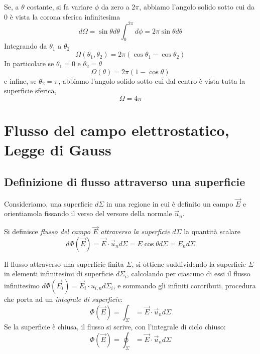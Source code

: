 \documentclass[class=book, crop=false, oneside, 12pt]{standalone}
\begin{document}
Se, a \(\theta\) costante, si fa variare \(\phi\) da zero a \(2 \pi\), abbiamo l'angolo solido sotto cui da \(0\) è vista la corona sferica infinitesima
\begin{equation}
    d \Omega = \sin \theta d \theta \int_0^{2 \pi} d \phi = 2 \pi \sin \theta d \theta
\end{equation}
Integrando da \(\theta_1\) a \(\theta_2\)
\begin{equation*}
    \Omega (\theta_1 , \theta_2) = 2 \pi \left(\cos \theta_1 - \cos \theta_2 \right)
\end{equation*}
In particolare se \(\theta_1 = 0\) e \(\theta_2 = \theta\)
\begin{equation}
    \Omega (\theta) = 2 \pi (1- \cos \theta)
\end{equation}
e infine, se \(\theta_2 = \pi\), abbiamo l'angolo solido sotto cui dal centro è vista tutta la superficie sferica, 
\begin{equation}
    \Omega = 4 \pi
\end{equation}

\section{Flusso del campo elettrostatico, Legge di Gauss}

\subsection{Definizione di flusso attraverso una superficie}

Consideriamo, una superficie \( d \Sigma\) in una regione in cui è definito un campo \(\overrightarrow{E}\) e orientiamola fissando il verso del versore della normale \(\overrightarrow{u}_n\). 

Si definisce \emph{flusso del campo \(\overrightarrow{E}\) attraverso la superficie} \(d \Sigma\) la quantità scalare 
\begin{equation} \label{definizione_flusso}
    d \Phi (\overrightarrow{E}) = \overrightarrow{E} \cdot \overrightarrow{u}_n d \Sigma = E \cos \theta d \Sigma = E_n d \Sigma
\end{equation}

Il flusso attraverso una superficie finita \(\Sigma\), si ottiene suddividendo la superficie \(\Sigma\) in elementi infinitesimi di superficie \(d \Sigma_i\), calcolando per ciascuno di essi il flusso infinitesimo \(d \Phi (\overrightarrow{E}_i) = \overrightarrow{E}_i \cdot u_{i,n} d \Sigma_i\), 
e sommando gli infiniti contributi, procedura che porta ad un \emph{integrale di superficie}:
\begin{equation}
    \Phi (\overrightarrow{E}) = \int_{\Sigma} = \overrightarrow{E} \cdot \overrightarrow{u}_n d \Sigma
\end{equation}
Se la superficie è chiusa, il flusso si scrive, con l'integrale di ciclo chiuso:
\begin{equation} \label{flusso_superficie_chiusa}
    \Phi (\overrightarrow{E}) = \oint_{\Sigma} = \overrightarrow{E} \cdot \overrightarrow{u}_n d \Sigma
\end{equation}
\end{document}
